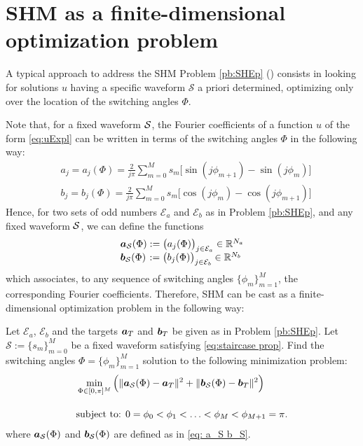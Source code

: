 \documentclass[twocolumn]{autart}    %
\begin{document}
\section{SHM as a finite-dimensional optimization problem}\label{sec:SHE_finite-dim_pbm}

A typical approach to address the SHM Problem \ref{pb:SHEp} (\cite{Sun1996,Konstantinou2010,Yang2015}) consists in looking for solutions $u$ having a specific waveform $\mathcal{S}$ a priori determined, optimizing only over the location of the switching angles $\Phi$. 

Note that, for a fixed waveform $\mathcal{S}$, the Fourier coefficients of a function $u$ of the form \eqref{eq:uExpl} can be written in terms of the switching angles $\Phi$ in the following way:
\begin{align*}
	& a_j = a_j(\Phi) =  \frac{2}{j\pi} \sum_{m=0}^{M} s_m \Big[\sin(j\phi_{m+1}) -\sin(j\phi_{m})\Big]
	\\[5pt]
	& b_j = b_j(\Phi) = \frac{2}{j\pi} \sum_{m=0}^{M} s_m \Big[\cos(j\phi_{m}) -\cos(j\phi_{m+1})\Big]
\end{align*}
Hence, for two sets of odd numbers $\mathcal{E}_a$ and $\mathcal{E}_b$ as in Problem \ref{pb:SHEp}, and any fixed waveform $\mathcal{S}$, we can define the functions
\begin{equation}\label{eq: a_S b_S}
\begin{array}{l}
	\bm{a}_{\mathcal{S}} (\Phi) := \big(a_j (\Phi)\big)_{j\in \mathcal{E}_a} \in \mathbb{R}^{N_a}
	\\
	\bm{b}_{\mathcal{S}} (\Phi) \hspace{0.1em}:= \big(b_j (\Phi)\big)_{j\in \mathcal{E}_b} \in \mathbb{R}^{N_b}
	\end{array}
\end{equation}
which associates, to any sequence of switching angles $\{\phi_m\}_{m=1}^{M}$, the corresponding Fourier coefficients.
Therefore,  SHM can be cast as a finite-dimensional optimization problem in the following way:

\bigskip

\begin{problem}\label{pb:SHE opt}
Let $\mathcal{E}_a$, $\mathcal{E}_b$ and the targets $\bm{a}_T$ and $\bm{b}_T$ be given as in Problem \ref{pb:SHEp}.  Let $\mathcal S := \{ s_m\}_{m=0}^M$ be a fixed waveform satisfying \eqref{eq:staircase prop}.  Find the switching angles $\Phi = \{\phi_m\}_{m=1}^{M}$ solution to the following minimization problem:
\begin{align}
	&\min_{\Phi \in [0,\pi]^{M}} \Big( \|\bm{a}_{\mathcal{S}} (\Phi) - \bm{a}_T\|^2 + \| \bm{b}_{\mathcal{S}} (\Phi) - \bm{b}_T\|^2\Big)\notag 
	\\[10pt]
	&\mbox{subject to: } 0 = \phi_0 <\phi_1 < \ldots < \phi_{M} < \phi_{M+1} = \pi. \notag 
\end{align}
where $\bm{a}_{\mathcal{S}} (\Phi)$ and $\bm{b}_{\mathcal{S}} (\Phi)$ are defined as in \eqref{eq: a_S b_S}.
\end{problem}
\end{document}
